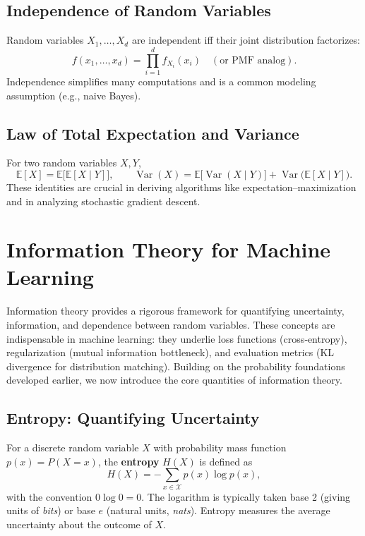 \documentclass{tufte-handout}
\begin{document}
\subsection{Independence of Random Variables}
Random variables $X_1,\dots,X_d$ are independent iff their joint distribution factorizes:
\[
f(x_1,\dots,x_d) = \prod_{i=1}^d f_{X_i}(x_i) \quad (\text{or PMF analog}).
\]
Independence simplifies many computations and is a common modeling assumption (e.g., naive Bayes).

\subsection{Law of Total Expectation and Variance}
For two random variables $X,Y$,
\[
\mathbb{E}[X] = \mathbb{E}\bigl[\mathbb{E}[X \mid Y]\bigr],\qquad
\operatorname{Var}(X) = \mathbb{E}\bigl[\operatorname{Var}(X \mid Y)\bigr] + \operatorname{Var}\bigl(\mathbb{E}[X \mid Y]\bigr).
\]
These identities are crucial in deriving algorithms like expectation–maximization and in analyzing stochastic gradient descent.

\section{Information Theory for Machine Learning}

Information theory provides a rigorous framework for quantifying uncertainty, information, and dependence between random variables. These concepts are indispensable in machine learning: they underlie loss functions (cross‑entropy), regularization (mutual information bottleneck), and evaluation metrics (KL divergence for distribution matching). Building on the probability foundations developed earlier, we now introduce the core quantities of information theory.

\subsection{Entropy: Quantifying Uncertainty}

\begin{defn}
    For a discrete random variable $X$ with probability mass function $p(x) = P(X=x)$, the \textbf{entropy} $H(X)$ is defined as
    \[
    H(X) = -\sum_{x \in \mathcal{X}} p(x) \log p(x),
    \]
    with the convention $0 \log 0 = 0$. The logarithm is typically taken base 2 (giving units of \textit{bits}) or base $e$ (natural units, \textit{nats}). Entropy measures the average uncertainty about the outcome of $X$.
\end{defn}
\end{document}
